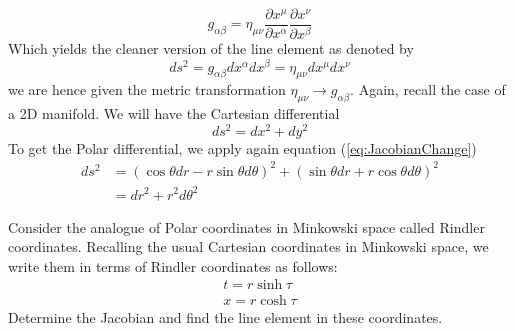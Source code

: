 \documentclass{article}
\begin{document}
\begin{exmp}
\begin{equation}
 				\label{eq:MetricVariance}
 				\boxed{g_{\alpha \beta} = \eta_{\mu\nu}\frac{\partial x^\mu}{\partial x^\alpha}\frac{\partial x^\nu}{\partial x^\beta} }
 			\end{equation}
 			Which yields the cleaner version of the line element as denoted by
 			\begin{equation}
 				\label{eq:FlatMinkowskiLineElement}
 				\boxed{ds^2 = g_{\alpha \beta} dx^\alpha dx^\beta =\eta_{\mu\nu} dx^\mu dx^\nu }
 			\end{equation}
 			we are hence given the metric transformation $\eta_{\mu\nu} \to g_{\alpha \beta}$.
 			Again, recall the case of a 2D manifold. We will have the Cartesian differential
 			$$ ds^2 = dx^2 + dy^2 $$
 			To get the Polar differential, we apply again equation (\ref{eq:JacobianChange})
 			\begin{align*}
 				ds^2 &= \left(\cos \theta dr - r \sin \theta d\theta\right)^2 + \left(\sin \theta dr + r \cos \theta d \theta \right)^2 \\
 				&= dr^2+  r^2 d\theta^2
 			\end{align*}
 		\end{exmp}
 		\begin{exe}
 			Consider the analogue of Polar coordinates in Minkowski space called Rindler coordinates. Recalling the usual Cartesian coordinates in Minkowski space, we write them in terms of Rindler coordinates as follows:
 			\begin{align*}
 				t = r \sinh \tau \\
 				x = r \cosh \tau
 			\end{align*}
 			Determine the Jacobian and find the line element in these coordinates.
 		\end{exe}
\end{document}
